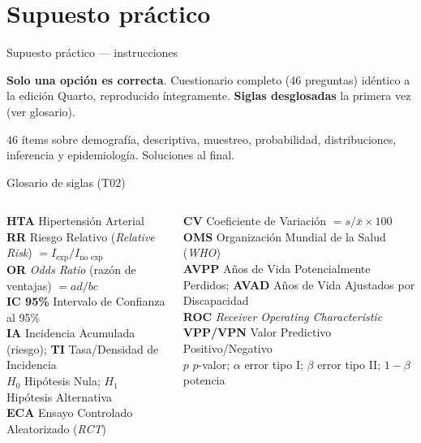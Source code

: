 \documentclass[aspectratio=169,8pt]{beamer}
\begin{document}
\section{Supuesto pr\'actico}

\begin{frame}{Supuesto pr\'actico --- instrucciones}
  \small
  \begin{tcolorbox}[amberbox]
    \textbf{Solo una opci\'on es correcta}. Cuestionario completo (46 preguntas) id\'entico a la edici\'on Quarto, reproducido \'integramente. \textbf{Siglas desglosadas} la primera vez (ver glosario).
  \end{tcolorbox}
  \vspace{0.2em}
  {\scriptsize\color{neutral}46 \'items sobre demograf\'ia, descriptiva, muestreo, probabilidad, distribuciones, inferencia y epidemiolog\'ia. Soluciones al final.}
\end{frame}

\begin{frame}{Glosario de siglas (T02)}
  \scriptsize
  \begin{columns}[T,onlytextwidth]
      \begin{tcolorbox}[infobox,title=Siglas cl\'inicas y epidemiol\'ogicas]
        \scriptsize
        \textbf{HTA} Hipertensi\'on Arterial\\
        \textbf{RR} Riesgo Relativo (\emph{Relative Risk}) $=I_{\text{exp}}/I_{\text{no exp}}$\\
        \textbf{OR} \emph{Odds Ratio} (raz\'on de ventajas) $=ad/bc$\\
        \textbf{IC 95\%} Intervalo de Confianza al 95\%\\
        \textbf{IA} Incidencia Acumulada (riesgo); \textbf{TI} Tasa/Densidad de Incidencia\\
        \textbf{$H_0$} Hip\'otesis Nula; \textbf{$H_1$} Hip\'otesis Alternativa\\
        \textbf{ECA} Ensayo Controlado Aleatorizado (\emph{RCT})
      \end{tcolorbox}
      \begin{tcolorbox}[tealbox]
        \scriptsize
        \textbf{CV} Coeficiente de Variaci\'on $=s/\bar x\times100$\\
        \textbf{OMS} Organizaci\'on Mundial de la Salud (\emph{WHO})\\
        \textbf{AVPP} A\~nos de Vida Potencialmente Perdidos; \textbf{AVAD} A\~nos de Vida Ajustados por Discapacidad\\
        \textbf{ROC} \emph{Receiver Operating Characteristic}\\
        \textbf{VPP/VPN} Valor Predictivo Positivo/Negativo\\
        \textbf{$p$} $p$-valor; \textbf{$\alpha$} error tipo I; \textbf{$\beta$} error tipo II; \textbf{$1-\beta$} potencia
      \end{tcolorbox}
  \end{columns}
\end{frame}
\end{document}
